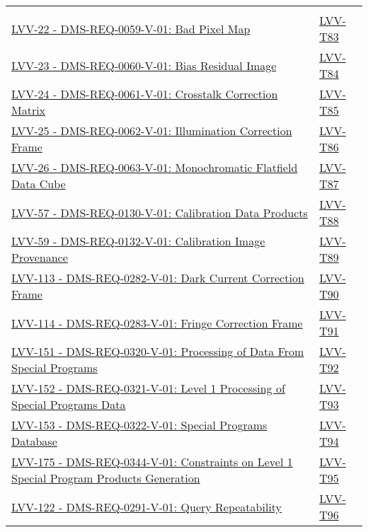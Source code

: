 {\begin{longtable}[]{p{13cm}p{3cm}}
{} \\
\href{https://jira.lsstcorp.org/browse/LVV-22}{LVV-22 - DMS-REQ-0059-V-01: Bad Pixel Map}
& {
\hyperref[lvv-t83]{LVV-T83}
} \\
\href{https://jira.lsstcorp.org/browse/LVV-23}{LVV-23 - DMS-REQ-0060-V-01: Bias Residual Image}
& {
\hyperref[lvv-t84]{LVV-T84}
} \\
\href{https://jira.lsstcorp.org/browse/LVV-24}{LVV-24 - DMS-REQ-0061-V-01: Crosstalk Correction Matrix}
& {
\hyperref[lvv-t85]{LVV-T85}
} \\
\href{https://jira.lsstcorp.org/browse/LVV-25}{LVV-25 - DMS-REQ-0062-V-01: Illumination Correction Frame}
& {
\hyperref[lvv-t86]{LVV-T86}
} \\
\href{https://jira.lsstcorp.org/browse/LVV-26}{LVV-26 - DMS-REQ-0063-V-01: Monochromatic Flatfield Data Cube}
& {
\hyperref[lvv-t87]{LVV-T87}
} \\
\href{https://jira.lsstcorp.org/browse/LVV-57}{LVV-57 - DMS-REQ-0130-V-01: Calibration Data Products}
& {
\hyperref[lvv-t88]{LVV-T88}
} \\
\href{https://jira.lsstcorp.org/browse/LVV-59}{LVV-59 - DMS-REQ-0132-V-01: Calibration Image Provenance}
& {
\hyperref[lvv-t89]{LVV-T89}
} \\
\href{https://jira.lsstcorp.org/browse/LVV-113}{LVV-113 - DMS-REQ-0282-V-01: Dark Current Correction Frame}
& {
\hyperref[lvv-t90]{LVV-T90}
} \\
\href{https://jira.lsstcorp.org/browse/LVV-114}{LVV-114 - DMS-REQ-0283-V-01: Fringe Correction Frame}
& {
\hyperref[lvv-t91]{LVV-T91}
} \\
\href{https://jira.lsstcorp.org/browse/LVV-151}{LVV-151 - DMS-REQ-0320-V-01: Processing of Data From Special Programs}
& {
\hyperref[lvv-t92]{LVV-T92}
} \\
\href{https://jira.lsstcorp.org/browse/LVV-152}{LVV-152 - DMS-REQ-0321-V-01: Level 1 Processing of Special Programs Data}
& {
\hyperref[lvv-t93]{LVV-T93}
} \\
\href{https://jira.lsstcorp.org/browse/LVV-153}{LVV-153 - DMS-REQ-0322-V-01: Special Programs Database}
& {
\hyperref[lvv-t94]{LVV-T94}
} \\
\href{https://jira.lsstcorp.org/browse/LVV-175}{LVV-175 - DMS-REQ-0344-V-01: Constraints on Level 1 Special Program Products Generation}
& {
\hyperref[lvv-t95]{LVV-T95}
} \\
\href{https://jira.lsstcorp.org/browse/LVV-122}{LVV-122 - DMS-REQ-0291-V-01: Query Repeatability}
& {
\hyperref[lvv-t96]{LVV-T96}
} \\

\end{longtable}}

